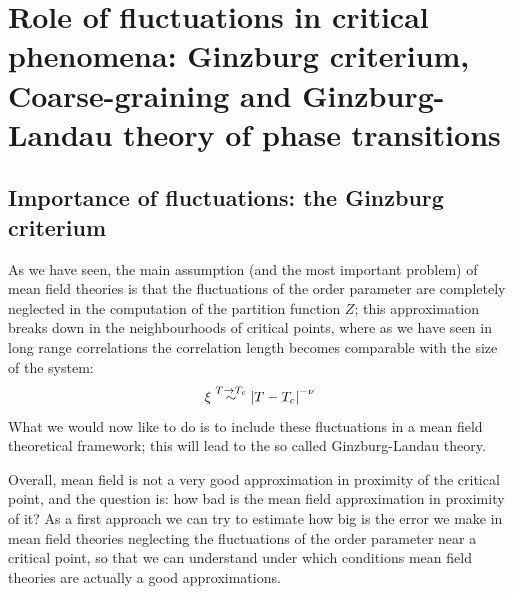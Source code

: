 \documentclass[../main/main.tex]{subfiles}
\begin{document}
\chapter{Role of fluctuations in critical phenomena: Ginzburg criterium, Coarse-graining and Ginzburg-Landau theory of phase transitions}

\section{Importance of fluctuations: the Ginzburg criterium}
As we have seen, the main assumption (and the most important problem) of mean field theories is that the fluctuations of the order parameter are completely neglected in the computation of the partition function \( Z \); this approximation breaks down in the neighbourhoods of critical points, where as we have seen in long range correlations the correlation length becomes comparable with the size of the system:
\begin{equation*}
   \xi \overset{T \rightarrow T_c}{\sim } \abs{T-T_c}^{-\nu }
\end{equation*}
 What we would now like to do is to include these fluctuations in a mean field theoretical framework; this will lead to the so called Ginzburg-Landau theory.

Overall, mean field is not a very good approximation in proximity of the critical point, and the question is: how bad is the mean field approximation in proximity of it?
As a first approach we can try to estimate how big is the error we make in mean field theories neglecting the fluctuations of the order parameter near a critical point, so that we can understand under which conditions mean field theories are actually a good approximations.
\end{document}
